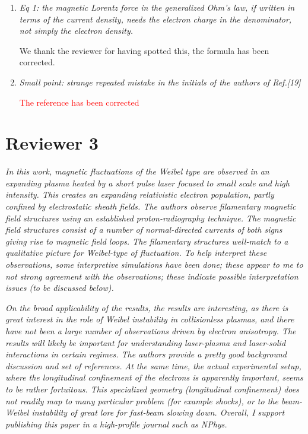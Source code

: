 \documentclass[aps,showpacs,superscriptaddress]{revtex4}%
\begin{document}
\begin{enumerate}
\item \textit{Eq 1: the magnetic Lorentz force in the generalized Ohm's law, if written in terms of the current density, needs the electron charge in the denominator, not simply the electron density. }

We thank the reviewer for having spotted this, the formula has been corrected.

\item \textit{Small point: strange repeated mistake in the initials of the authors of Ref.[19] }

\textcolor{red}{The reference has been corrected}
\end{enumerate}

\section{Reviewer 3 }
\textit{
In this work, magnetic fluctuations of the Weibel type are observed in an expanding plasma heated by a short pulse laser focused to small scale and high intensity. This creates an expanding relativistic electron population, partly confined by electrostatic sheath fields. The authors observe filamentary magnetic field structures using an established proton-radiography technique. The magnetic field structures consist of a number of normal-directed currents of both signs giving rise to magnetic field loops. The filamentary structures well-match to a qualitative picture for Weibel-type of fluctuation. To help interpret these observations, some interpretive simulations have been done; these appear to me to not strong agreement with the observations; these indicate possible interpretation issues (to be discussed below).}

\textit{
On the broad applicability of the results, the results are interesting, as there is great interest in the role of Weibel instability in collisionless plasmas, and there have not been a large number of observations driven by electron anisotropy. The results will likely be important for understanding laser-plasma and laser-solid interactions in certain regimes. The authors provide a pretty good background discussion and set of references. At the same time, the actual experimental setup, where the longitudinal confinement of the electrons is apparently important, seems to be rather fortuitous. This specialized geometry (longitudinal confinement) does not readily map to many particular problem (for example shocks), or to the beam-Weibel instability of great lore for fast-beam slowing down. Overall, I support publishing this paper in a high-profile journal such as NPhys.}
\end{document}
